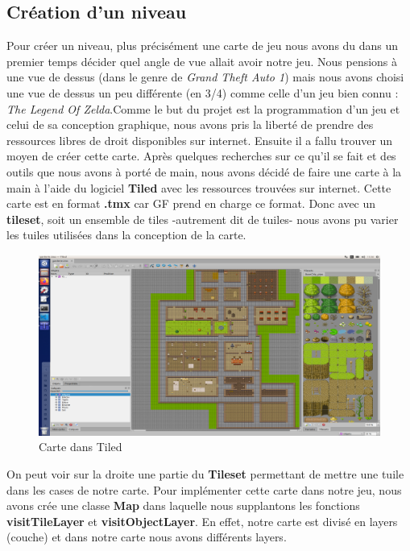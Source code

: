 \documentclass{article}
\begin{document}
\subsection{Création d'un niveau}
Pour créer un niveau, plus précisément une carte de jeu nous avons du dans un premier temps décider quel angle de vue allait avoir notre jeu. Nous pensions à une vue de dessus (dans le genre de \textit{Grand Theft Auto 1}) mais nous avons choisi une vue de dessus un peu différente (en 3/4) comme celle d'un jeu bien connu : \textit{The Legend Of Zelda}.\bigbreak Comme le but du projet est la programmation d'un jeu et celui de sa conception graphique, nous avons pris la liberté de prendre des ressources libres de droit disponibles sur internet. Ensuite il a fallu trouver un moyen de créer cette carte. Après quelques recherches sur ce qu'il se fait et des outils que nous avons à porté de main, nous avons décidé de faire une carte à la main à l'aide du logiciel \textbf{Tiled} avec les ressources trouvées sur internet. Cette carte est en format \textbf{.tmx} car GF prend en charge ce format. Donc avec un \textbf{tileset}, soit un ensemble de tiles -autrement dit de \og tuiles\fg- nous avons pu varier les tuiles utilisées dans la conception de la carte. 
\begin{figure}[ht]
    \begin{center}
    \includegraphics[scale=0.22]{images/map_entiere.png}
    \caption{Carte dans Tiled}
    \label{map_entiere}
    \end{center}
\end{figure}
On peut voir sur la droite une partie du \textbf{Tileset} permettant de mettre une tuile dans les cases de notre carte.
\newpage 
Pour implémenter cette carte dans notre jeu, nous avons crée une classe \textbf{Map} dans laquelle nous supplantons les fonctions \textbf{visitTileLayer} et \textbf{visitObjectLayer}. En effet, notre carte est divisé en layers (couche) et dans notre carte nous avons différents layers.
\end{document}
